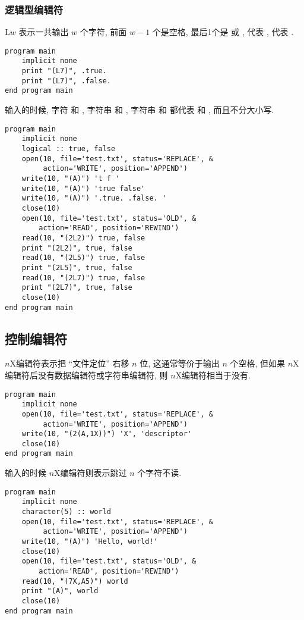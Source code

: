 \subsubsection{逻辑型编辑符}

L$ w $ 表示一共输出 $ w $ 个字符, 前面 $ w-1 $ 个是空格, 最后1个是  或 ,  代表 ,  代表 . 
\begin{lstlisting}
program main
    implicit none
    print "(L7)", .true. 
    print "(L7)", .false. 
end program main
\end{lstlisting}
输入的时候, 字符  和 , 字符串  和 , 字符串  和  都代表  和 , 而且不分大小写. 
\begin{lstlisting}
program main
    implicit none
    logical :: true, false
    open(10, file='test.txt', status='REPLACE', &
         action='WRITE', position='APPEND')
    write(10, "(A)") 't f '
    write(10, "(A)") 'true false'
    write(10, "(A)") '.true. .false. '
    close(10)
    open(10, file='test.txt', status='OLD', &
        action='READ', position='REWIND')
    read(10, "(2L2)") true, false
    print "(2L2)", true, false
    read(10, "(2L5)") true, false
    print "(2L5)", true, false
    read(10, "(2L7)") true, false
    print "(2L7)", true, false
    close(10)
end program main
\end{lstlisting}

\subsection{控制编辑符}

$ n $X编辑符表示把 ``文件定位'' 右移 $ n $ 位, 这通常等价于输出 $ n $ 个空格, 但如果 $ n $X编辑符后没有数据编辑符或字符串编辑符, 则 $ n $X编辑符相当于没有. 
\begin{lstlisting}
program main
    implicit none
    open(10, file='test.txt', status='REPLACE', &
         action='WRITE', position='APPEND')
    write(10, "(2(A,1X))") 'X', 'descriptor'
    close(10)
end program main
\end{lstlisting}
输入的时候 $ n $X编辑符则表示跳过 $ n $ 个字符不读. 
\begin{lstlisting}
program main
    implicit none
    character(5) :: world
    open(10, file='test.txt', status='REPLACE', &
         action='WRITE', position='APPEND')
    write(10, "(A)") 'Hello, world!'
    close(10)
    open(10, file='test.txt', status='OLD', &
        action='READ', position='REWIND')
    read(10, "(7X,A5)") world
    print "(A)", world
    close(10)
end program main
\end{lstlisting}

